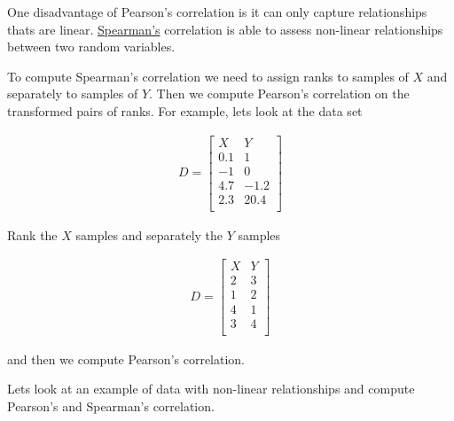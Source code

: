 \documentclass[11pt]{article}
\begin{document}
One disadvantage of Pearson's correlation is it can only capture
relationships thats are linear.
\href{https://en.wikipedia.org/wiki/Charles_Spearman}{Spearman's}
correlation is able to assess non-linear relationships between two
random variables.

To compute Spearman's correlation we need to assign ranks to samples of
\(X\) and separately to samples of \(Y\). Then we compute Pearson's
correlation on the transformed pairs of ranks. For example, lets look at
the data set

\begin{align}
    D = \left[
        \begin{matrix}
            X & Y\\
            \hline
            0.1 & 1\\
            -1  & 0\\
            4.7 & -1.2\\
            2.3 & 20.4\\
        \end{matrix}
        \right]
\end{align}

Rank the \(X\) samples and separately the \(Y\) samples

\begin{align}
    D = \left[
        \begin{matrix}
            X & Y\\
            \hline
            2 & 3\\
            1  & 2\\
            4 & 1\\
            3 & 4\\
        \end{matrix}
        \right]
\end{align}

and then we compute Pearson's correlation.

Lets look at an example of data with non-linear relationships and
compute Pearson's and Spearman's correlation.
\end{document}
